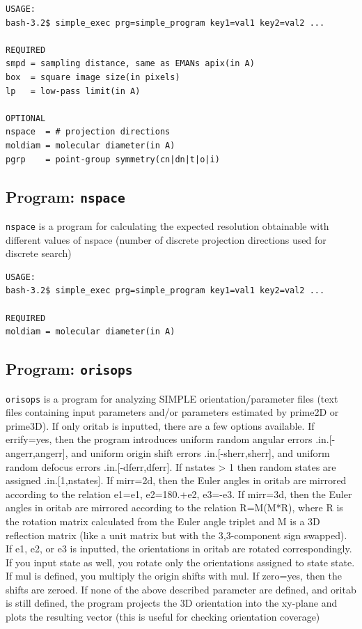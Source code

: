 \documentclass[a4paper,11pt]{article}
\newcommand{\prgname}[1]{\textcolor{NavyBlue}{\texttt{#1}}}
\begin{document}
\begin{verbatim}
USAGE:
bash-3.2$ simple_exec prg=simple_program key1=val1 key2=val2 ...

REQUIRED
smpd = sampling distance, same as EMANs apix(in A)
box  = square image size(in pixels)
lp   = low-pass limit(in A)

OPTIONAL
nspace  = # projection directions
moldiam = molecular diameter(in A)
pgrp    = point-group symmetry(cn|dn|t|o|i)
\end{verbatim}

\subsection{Program: \prgname{nspace}}
\label{nspace}
\prgname{nspace} is a program for calculating the expected resolution obtainable with different values of nspace (number of discrete projection directions used for discrete search)

\begin{verbatim}
USAGE:
bash-3.2$ simple_exec prg=simple_program key1=val1 key2=val2 ...

REQUIRED
moldiam = molecular diameter(in A)
\end{verbatim}

\subsection{Program: \prgname{orisops}}
\label{orisops}
\prgname{orisops} is a program for analyzing SIMPLE orientation/parameter files (text files containing input parameters and/or parameters estimated by prime2D or prime3D). If only oritab is inputted, there are a few options available. If errify=yes, then the program introduces uniform random angular errors .in.[-angerr,angerr], and uniform origin shift errors .in.[-sherr,sherr], and uniform random defocus errors .in.[-dferr,dferr]. If nstates > 1 then random states are assigned .in.[1,nstates]. If mirr=2d, then the Euler angles in oritab are mirrored according to the relation e1=e1, e2=180.+e2, e3=-e3. If mirr=3d, then the Euler angles in oritab are mirrored according to the relation R=M(M*R), where R is the rotation matrix calculated from the Euler angle triplet and M is a 3D reflection matrix (like a unit matrix but with the 3,3-component sign swapped). If e1, e2, or e3 is inputted, the orientations in oritab are rotated correspondingly. If you input state as well, you rotate only the orientations assigned to state state. If mul is defined, you multiply the origin shifts with mul. If zero=yes, then the shifts are zeroed. If none of the above described parameter are defined, and oritab is still defined, the program projects the 3D orientation into the xy-plane and plots the resulting vector (this is useful for checking orientation coverage)
\end{document}
